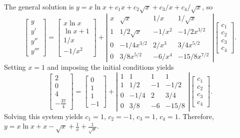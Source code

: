 \documentclass{ximera}
\begin{document}
\begin{problem}
\begin{solution}
The general solution is $y=x\ln x+c_1x+c_2\sqrt x+c_3/x+c_4/\sqrt x$,
so
$$
\left[\begin{array}{l}y\\y'\\y''\\y'''
\end{array}\right]=
\left[\begin{array}{c}
x\ln x\\\ln x+1\\1/x\\-1/x^2
\end{array}\right]+
\left|\begin{array}{cccc}
x&\sqrt{x}&1/x&1/\sqrt{x}\\
1&1/2\sqrt{x}&-1/x^2&-1/2x^{3/2}\\
0&-1/4x^{3/2}&2/x^3&3/4x^{5/2}\\
0&3/8x^{5/2}&-6/x^4&-15/8x^{7/2}
\end{array}\right|
\left[\begin{array}{c}
c_1\\c_2\\c_3\\c_4
\end{array}\right].
$$
Setting $x=1$ and imposing the initial conditions yields
$$
\left[\begin{array}{c}
2\\0\\4\\-\frac{37}{4}
\end{array}\right]=
\left[\begin{array}{r}
0\\1\\1\\-1
\end{array}\right]+
\left|\begin{array}{cccc}1&1&1&1\\1&1/2&-1&-1/2\\
0&-1/4&2&3/4\\0&3/8&-6&-15/8\end{array}\right|
\left[\begin{array}{c}
c_1\\c_2\\c_3\\c_4
\end{array}\right].
$$
Solving this system yields $c_1=1$, $c_2=-1$, $c_3=1$, $c_4=1$.
Therefore,  $y=x\ln x+x-\sqrt x+\frac{1}{x}+\frac{1}{\sqrt x}$.
\end{solution}
\end{problem}
\end{document}

